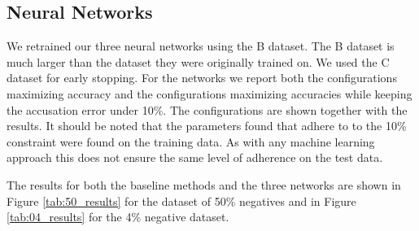 \subsection{Neural Networks}

We retrained our three neural networks using the \gls{B} dataset. The \gls{B}
dataset is much larger than the dataset they were originally trained on. We used
the \gls{C} dataset for early stopping. For the networks we report both the
configurations maximizing accuracy and the configurations maximizing accuracies
while keeping the accusation error under 10\%. The configurations are shown
together with the results. It should be noted that the parameters found that
adhere to to the 10\% constraint were found on the training data. As with any
machine learning approach this does not ensure the same level of adherence on
the test data.

The results for both the baseline methods and the three networks are shown in
Figure \ref{tab:50_results} for the dataset of 50\% negatives and in Figure
\ref{tab:04_results} for the 4\% negative dataset. 

